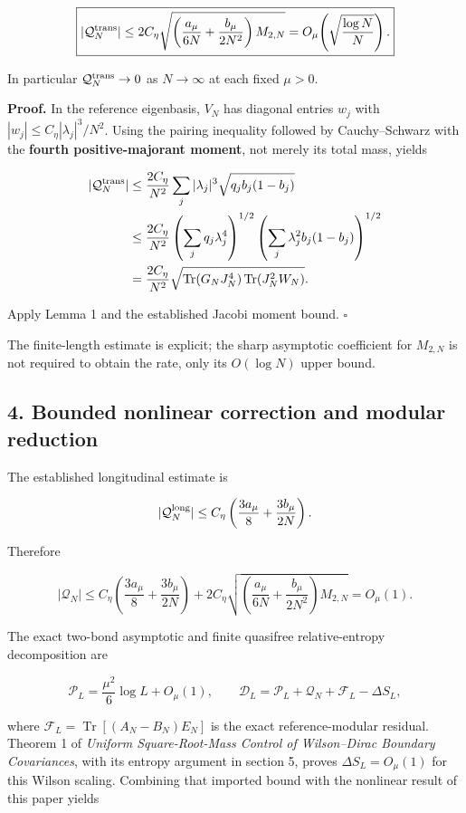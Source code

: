 \documentclass[
  10pt,
  a4paper,
]{article}
\begin{document}
\[
\boxed{
|\mathcal Q_N^{\rm trans}|
\le2C_\eta\sqrt{\left(\frac{a_\mu}{6N}+\frac{b_\mu}{2N^2}\right)M_{2,N}}
=O_\mu\!\left(\sqrt{\frac{\log N}{N}}\right).
}
\]

In particular \(\mathcal Q_N^{\rm trans}\to0\) as \(N\to\infty\) at each fixed \(\mu>0\).

\textbf{Proof.} In the reference eigenbasis, \(V_N\) has diagonal entries \(w_j\) with \(|w_j|\le C_\eta|\lambda_j|^3/N^2\). Using the pairing inequality followed by Cauchy--Schwarz with the \textbf{fourth positive-majorant moment}, not merely its total mass, yields

\[
\begin{aligned}
|\mathcal Q_N^{\rm trans}|
&\le\frac{2C_\eta}{N^2}\sum_j|\lambda_j|^3\sqrt{q_jb_j(1-b_j)}\\
&\le\frac{2C_\eta}{N^2}
\left(\sum_jq_j\lambda_j^4\right)^{1/2}
\left(\sum_j\lambda_j^2b_j(1-b_j)\right)^{1/2}\\
&=\frac{2C_\eta}{N^2}
\sqrt{\operatorname{Tr}(G_NJ_N^4)\operatorname{Tr}(J_N^2W_N)}.
\end{aligned}
\]

Apply Lemma 1 and the established Jacobi moment bound. \(\square\)

The finite-length estimate is explicit; the sharp asymptotic coefficient for \(M_{2,N}\) is not required to obtain the rate, only its \(O(\log N)\) upper bound.

\subsection{4. Bounded nonlinear correction and modular reduction}\label{bounded-nonlinear-correction-and-modular-reduction}

The established longitudinal estimate is

\[
|\mathcal Q_N^{\rm long}|\le C_\eta\left(\frac{3a_\mu}{8}+\frac{3b_\mu}{2N}\right).
\]

Therefore

\[
\boxed{
|\mathcal Q_N|\le C_\eta\left(\frac{3a_\mu}{8}+\frac{3b_\mu}{2N}\right)
+2C_\eta\sqrt{\left(\frac{a_\mu}{6N}+\frac{b_\mu}{2N^2}\right)M_{2,N}}
=O_\mu(1).}
\]

The exact two-bond asymptotic and finite quasifree relative-entropy decomposition are

\[
\mathcal P_L=\frac{\mu^2}{6}\log L+O_\mu(1),\qquad
\mathcal D_L=\mathcal P_L+\mathcal Q_N+\mathcal F_L-\Delta S_L,
\]

where \(\mathcal F_L=\operatorname{Tr}[(A_N-B_N)E_N]\) is the exact reference-modular residual. Theorem 1 of \emph{Uniform Square-Root-Mass Control of Wilson--Dirac Boundary Covariances}, with its entropy argument in section 5, proves \(\Delta S_L=O_\mu(1)\) for this Wilson scaling. Combining that imported bound with the nonlinear result of this paper yields
\end{document}
